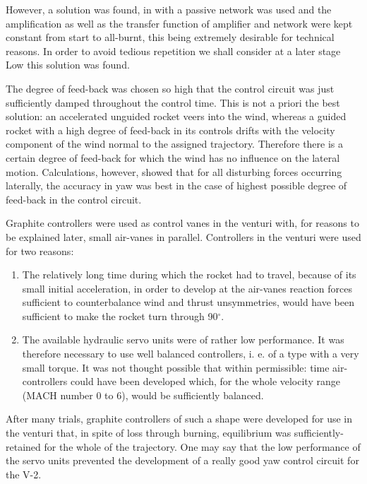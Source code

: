 \documentclass[12pt, a4paper]{article}
\begin{document}
However, a solution was found, in with a passive network was used and the amplification as well as the transfer function of amplifier and network were kept constant from start to all-burnt, this being extremely desirable for technical reasons. In order to avoid tedious repetition we shall consider at a later stage Low this solution was found.

The degree of feed-back was chosen so high that the control circuit was just sufficiently damped throughout the control time. This is not a priori the best solution: an accelerated unguided rocket veers into the wind, whereas a guided rocket with a high degree of feed-back in its controls drifts with the velocity component of the wind normal to the assigned trajectory. Therefore there is a certain degree of feed-back for which the wind has no influence on the lateral motion. Calculations, however, showed that for all disturbing forces occurring laterally, the accuracy in yaw was best in the case of highest possible degree of feed-back in the control circuit.

Graphite controllers were used as control vanes in the venturi with, for reasons to be explained later, small air-vanes in parallel. Controllers in the venturi were used for two reasons:

\begin{enumerate}
  \item The relatively long time during which the rocket had to travel, because of its small initial acceleration, in order to develop at the air-vanes reaction forces sufficient to counterbalance wind and thrust unsymmetries, would have been sufficient to make the rocket turn through 90$^\circ$.
  \item The available hydraulic servo units were of rather low performance. It was therefore necessary to use well balanced controllers, i. e. of a type with a very small torque. It was not thought possible that within permissible: time air-controllers could have been developed which, for the whole velocity range (MACH number 0 to 6), would be sufficiently balanced.
\end{enumerate}

After many trials, graphite controllers of such a shape were developed for use in the venturi that, in spite of loss through burning, equilibrium was sufficiently- retained for the whole of the trajectory. One may say that the low performance of the servo units prevented the development of a really good yaw control circuit for the V-2.
\end{document}
